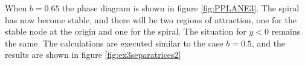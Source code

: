 When $b=0.65$ the phase diagram is shown in figure \ref{fig:PPLANE3}. The spiral has now become stable, and there will be two regions of attraction, one for the stable node at the origin and one for the spiral. The situation for $y<0$ remains the same. The calculations are executed similar to the case $b=0.5$, and the results are shown in figure \ref{fig:ex3separatrices2}
\begin{figure}[htp]
\centering
{}
\caption{}
\label{fig:}
\end{figure}
